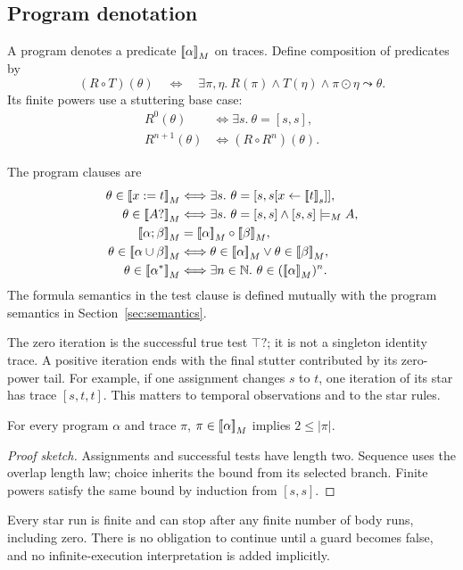 \subsection{Program denotation}
A program denotes a predicate $\mathopen{[\![}\alpha\mathclose{]\!]}_M$ on traces. Define
composition of predicates by
\[
 (R\circ T)(\theta)\quad\Longleftrightarrow\quad
 \exists\pi,\eta.\ R(\pi)\land T(\eta)\land\pi\odot\eta\leadsto\theta.
\]
Its finite powers use a stuttering base case:
\begin{align*}
 R^0(\theta)&\Longleftrightarrow\exists s.\ \theta=[s,s],\\
 R^{n+1}(\theta)&\Longleftrightarrow(R\circ R^n)(\theta).
\end{align*}

The program clauses are
\begin{align*}
 \theta\in\interp{x:=t}_M
   &\Longleftrightarrow\exists s.\ \theta=[s,s[x\leftarrow\eval{t}{s}]],\\
 \theta\in\interp{A?}_M
   &\Longleftrightarrow\exists s.\ \theta=[s,s]\land[s,s]\sat_M A,\\
 \interp{\alpha;\beta}_M&=\interp{\alpha}_M\circ\interp{\beta}_M,\\
 \theta\in\interp{\alpha\cup\beta}_M
   &\Longleftrightarrow\theta\in\interp{\alpha}_M\lor\theta\in\interp{\beta}_M,\\
 \theta\in\interp{\alpha^*}_M
   &\Longleftrightarrow\exists n\in\N.\ \theta\in(\interp{\alpha}_M)^n.
\end{align*}
The formula semantics in the test clause is defined mutually with the program
semantics in Section~\ref{sec:semantics}.

The zero iteration is the successful true test $\top?$; it is not a singleton
identity trace. A positive iteration ends with the final stutter contributed
by its zero-power tail. For example, if one assignment changes $s$ to $t$,
one iteration of its star has trace $[s,t,t]$. This matters to temporal
observations and to the star rules.

\begin{lemma}
For every program $\alpha$ and trace $\pi$,
$\pi\in\mathopen{[\![}\alpha\mathclose{]\!]}_M$ implies $2\le|\pi|$.
\end{lemma}
\begin{proof}[Proof sketch]
Assignments and successful tests have length two. Sequence uses the overlap
length law; choice inherits the bound from its selected branch. Finite
powers satisfy the same bound by induction from $[s,s]$.
\end{proof}

Every star run is finite and can stop after any finite number of body runs,
including zero. There is no obligation to continue until a guard becomes
false, and no infinite-execution interpretation is added implicitly.
